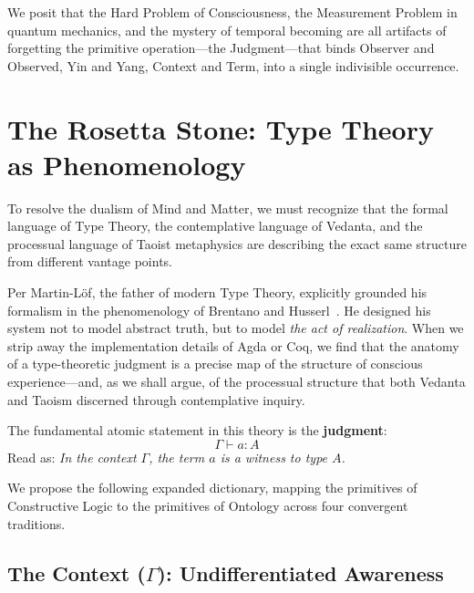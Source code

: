 \documentclass[12pt,a4paper]{article}
\newcommand{\turnstile}{\vdash}
\begin{document}
We posit that the Hard Problem of Consciousness, the Measurement Problem in quantum mechanics, and the mystery of temporal becoming are all artifacts of forgetting the primitive operation---the Judgment---that binds Observer and Observed, Yin and Yang, Context and Term, into a single indivisible occurrence.


\section{The Rosetta Stone: Type Theory as Phenomenology}
\label{sec:rosetta}

To resolve the dualism of Mind and Matter, we must recognize that the formal language of Type Theory, the contemplative language of Vedanta, and the processual language of Taoist metaphysics are describing the exact same structure from different vantage points.

Per Martin-L\"of, the father of modern Type Theory, explicitly grounded his formalism in the phenomenology of Brentano and Husserl~\cite{martinlof}. He designed his system not to model abstract truth, but to model \emph{the act of realization}. When we strip away the implementation details of Agda or Coq, we find that the anatomy of a type-theoretic judgment is a precise map of the structure of conscious experience---and, as we shall argue, of the processual structure that both Vedanta and Taoism discerned through contemplative inquiry.

The fundamental atomic statement in this theory is the \textbf{judgment}:
\begin{equation}
\Gamma \turnstile a : A
\label{eq:judgment}
\end{equation}
Read as: \emph{In the context $\Gamma$, the term $a$ is a witness to type $A$.}

We propose the following expanded dictionary, mapping the primitives of Constructive Logic to the primitives of Ontology across four convergent traditions.


\subsection{The Context ($\Gamma$): Undifferentiated Awareness}
\label{sec:context}
\end{document}
